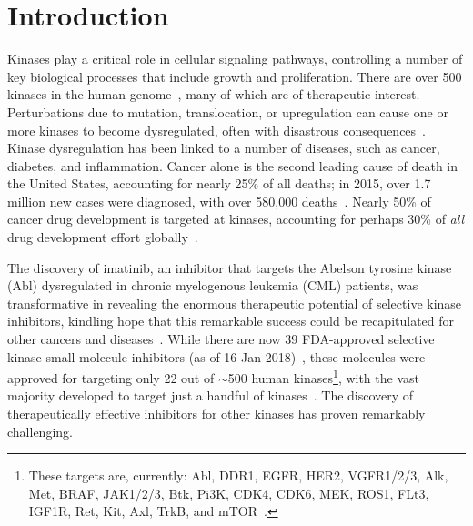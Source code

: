\documentclass[phd,tocprelim]{cornell}
\begin{document}
\section{Introduction}

Kinases play a critical role in cellular signaling pathways, controlling a number of key biological processes that include growth and proliferation. 
There are over 500 kinases in the human genome~\citep{manning:science:2002:kinome,Hunter:ReceptorTyrosineKinases:StructureFunctionsandRoleinHumanDisease:2015}, many of which are of therapeutic interest.
Perturbations due to mutation, translocation, or upregulation can cause one or more kinases to become dysregulated, often with disastrous consequences~\citep{knight_targeting_2010}.
Kinase dysregulation has been linked to a number of diseases, such as cancer, diabetes, and inflammation.
Cancer alone is the second leading cause of death in the United States, accounting for nearly 25\% of all deaths; in 2015, over 1.7 million new cases were diagnosed, with over 580,000 deaths~\citep{acs-cancer-facts-2015}. 
Nearly 50\% of cancer drug development is targeted at kinases, accounting for perhaps 30\% of \emph{all} drug development effort globally~\citep{cohen_will_2010,Santos:Nat.Rev.DrugDiscov.:2016}. 

The discovery of imatinib, an inhibitor that targets the Abelson tyrosine kinase (Abl) dysregulated in chronic myelogenous leukemia (CML) patients,
was transformative in revealing the enormous therapeutic potential of selective kinase inhibitors, kindling hope that this remarkable success could be recapitulated for other cancers and diseases~\citep{stegmeier:clpt:2010:imatinib-lessons}.
While there are now 39 FDA-approved selective kinase small molecule inhibitors (as of 16 Jan 2018)~\citep{wu_fda-approved_2015,fda-approved-kinase-inhibitors}, these molecules were approved for targeting only 22 out of $\sim$500 human kinases\footnote{These targets are, currently: Abl, DDR1, EGFR, HER2, VGFR1/2/3, Alk, Met, BRAF, JAK1/2/3, Btk, Pi3K, CDK4, CDK6, MEK, ROS1, FLt3, IGF1R, Ret, Kit, Axl, TrkB, and mTOR~\cite{fda-approved-kinase-inhibitors}.}, with the vast majority developed to target just a handful of kinases~\citep{doi:10.1021/ci500624s}. 
The discovery of therapeutically effective inhibitors for other kinases has proven remarkably challenging.
\end{document}
